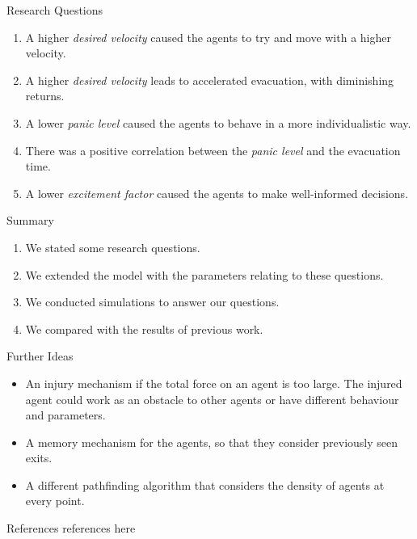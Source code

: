 \documentclass[aspectratio=43]{beamer}
\begin{document}
\begin{frame}{Research Questions}
	\begin{enumerate}
		\item A higher \emph{desired velocity} caused the agents to try and move with a higher velocity.
		\smallskip
		\item A higher \emph{desired velocity} leads to accelerated evacuation, with diminishing returns.
		\smallskip
		\item A lower \emph{panic level} caused the agents to behave in a more individualistic way.
		\smallskip
		\item There was a positive correlation between the \emph{panic level} and the evacuation time.
		\smallskip
		\item A lower \emph{excitement factor} caused the agents to make well-informed decisions.
	\end{enumerate}
\end{frame}


\begin{frame}{Summary}
	\begin{enumerate}
		\item We stated some research questions.
		\smallskip
		\item We extended the model with the parameters relating to these questions.
		\smallskip
		\item We conducted simulations to answer our questions.
		\smallskip
		\item We compared with the results of previous work.
	\end{enumerate}
\end{frame}


\begin{frame}{Further Ideas}
	\begin{itemize}
		\item An injury mechanism if the total force on an agent is too large. The injured agent could work as an obstacle to other agents or have different behaviour and parameters.
		\smallskip
		\item A memory mechanism for the agents, so that they consider previously seen exits.
		\smallskip
		\item A different pathfinding algorithm that considers the density of agents at every point.
	\end{itemize}
\end{frame}


\begin{frame}{References}
	references here
\end{frame}


\begin{inverseframe}
\end{inverseframe}
\end{document}
